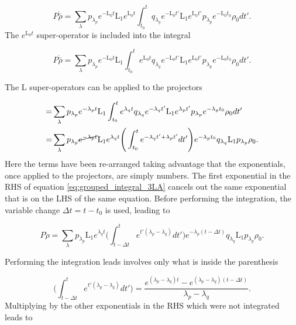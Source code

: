 \documentclass[12pt]{article}
\begin{document}
\begin{equation}
   P\dot{\overline{\rho}} = \sum_{\lambda} p_{\lambda_p} e^{-\mathrm{L}_0 t}\mathrm{L}_1e^{\mathrm{L}_0 t}\int_{t_0}^t  q_{\lambda_q}e^{-\mathrm{L}_0 t'}\mathrm{L}_1e^{\mathrm{L}_0 t'}p_{\lambda_p} e^{-\mathrm{L}_0 t_0}\rho_0 dt'.  
\end{equation}  The $e^{\mathrm{L}_0 t}$ super-operator is included into the integral 

\begin{equation}
   P\dot{\overline{\rho}} = \sum_{\lambda} p_{\lambda_p} e^{-\mathrm{L}_0 t}\mathrm{L}_1\int_{t_0}^t  e^{\mathrm{L}_0 t}q_{\lambda_q}e^{-\mathrm{L}_0 t'}\mathrm{L}_1e^{\mathrm{L}_0 t'}p_{\lambda_p} e^{-\mathrm{L}_0 t_0}\rho_0 dt'.  
\end{equation} 

The $\mathrm{L}$ super-operators can be applied to the projectors 

\begin{align}
    =& \sum_{\lambda} p_{\lambda_p} e^{-\lambda_p t}\mathrm{L}_1\int_{t_0}^t  e^{\lambda_q t}q_{\lambda_q}e^{-\lambda_q t'}\mathrm{L}_1e^{\lambda_p t'}p_{\lambda_p} e^{-\lambda_p t_0}\rho_0 dt' \\
    =& \sum_{\lambda} p_{\lambda_p} \cancel{e^{-\lambda_p t}}\mathrm{L}_1e^{\lambda_q t}\Bigg(\int_{t_0}^te^{-\lambda_q t'+\lambda_p t'}dt'\Bigg)e^{-\lambda_p t_0}  q_{\lambda_q}\mathrm{L}_1p_{\lambda_p} \rho_0.\label{eq:grouped_integral_3LA}
\end{align} Here the terms have been re-arranged taking advantage that the exponentials, once applied to the projectors, are simply numbers. The first exponential in the RHS of equation \eqref{eq:grouped_integral_3LA} cancels out the same exponential that is on the LHS of the same equation. Before performing the integration, the variable change $\Delta t = t-t_0$ is used, leading to

\begin{equation}
    P\dot{\rho}=\sum_{\lambda} p_{\lambda_p} \mathrm{L}_1e^{\lambda_q t}\Bigg(\int_{t-\Delta t}^te^{t'(\lambda_p-\lambda_q) }dt'\Bigg)e^{-\lambda_p( t-\Delta t)}  q_{\lambda_q}\mathrm{L}_1p_{\lambda_p} \rho_0.
\end{equation}

Performing the integration leads involves only what is inside the parenthesis

\begin{equation}
  \Bigg(\int_{t-\Delta t}^te^{t'(\lambda_p-\lambda_q) }dt'\Bigg) = \frac{e^{(\lambda_p-\lambda_q)t}-e^{(\lambda_p-\lambda_q)(t-\Delta t)}}{\lambda_p-\lambda_q}.  
\end{equation} Multiplying by the other exponentials in the RHS which were not integrated leads to
\end{document}
